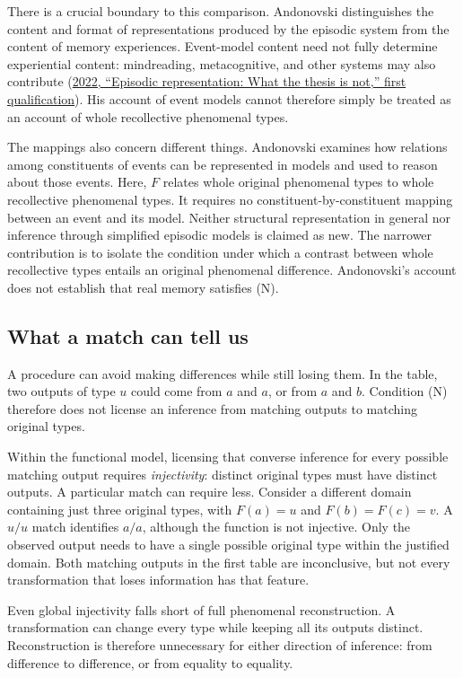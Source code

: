 There is a crucial boundary to this comparison. Andonovski distinguishes the content and format of representations produced by the episodic system from the content of memory experiences. Event-model content need not fully determine experiential content: mindreading, metacognitive, and other systems may also contribute (\hyperlink{ref:andonovski2022}{2022, “Episodic representation: What the thesis is not,” first qualification}). His account of event models cannot therefore simply be treated as an account of whole recollective phenomenal types.

The mappings also concern different things. Andonovski examines how relations among constituents of events can be represented in models and used to reason about those events. Here, \(F\) relates whole original phenomenal types to whole recollective phenomenal types. It requires no constituent-by-constituent mapping between an event and its model. Neither structural representation in general nor inference through simplified episodic models is claimed as new. The narrower contribution is to isolate the condition under which a contrast between whole recollective types entails an original phenomenal difference. Andonovski's account does not establish that real memory satisfies (N).

\subsection*{What a match can tell us}

A procedure can avoid making differences while still losing them. In the table, two outputs of type \(u\) could come from \(a\) and \(a\), or from \(a\) and \(b\). Condition (N) therefore does not license an inference from matching outputs to matching original types.

Within the functional model, licensing that converse inference for every possible matching output requires \emph{injectivity}: distinct original types must have distinct outputs. A particular match can require less. Consider a different domain containing just three original types, with \(F(a)=u\) and \(F(b)=F(c)=v\). A \(u/u\) match identifies \(a/a\), although the function is not injective. Only the observed output needs to have a single possible original type within the justified domain. Both matching outputs in the first table are inconclusive, but not every transformation that loses information has that feature.

Even global injectivity falls short of full phenomenal reconstruction. A transformation can change every type while keeping all its outputs distinct. Reconstruction is therefore unnecessary for either direction of inference: from difference to difference, or from equality to equality.

